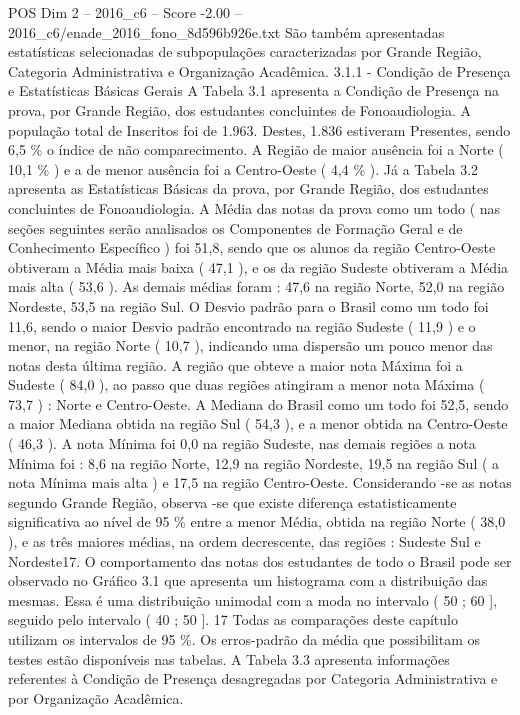 \begin{textsample}{POS Dim 2 – 2016\_c6 – Score -2.00 – 2016\_c6/enade\_2016\_fono\_8d596b926e.txt}
São também apresentadas estatísticas selecionadas de subpopulações caracterizadas por Grande Região, Categoria Administrativa e Organização Acadêmica. 3.1.1 - Condição de Presença e Estatísticas Básicas Gerais A Tabela 3.1 apresenta a Condição de Presença na prova, por Grande Região, dos estudantes concluintes de Fonoaudiologia.
A população total de Inscritos foi de 1.963.
Destes, 1.836 estiveram Presentes, sendo 6,5 \% o índice de não comparecimento.
A Região de maior ausência foi a Norte ( 10,1 \% ) e a de menor ausência foi a Centro-Oeste ( 4,4 \% ).
Já a Tabela 3.2 apresenta as Estatísticas Básicas da prova, por Grande Região, dos estudantes concluintes de Fonoaudiologia.
A Média das notas da prova como um todo ( nas seções seguintes serão analisados os Componentes de Formação Geral e de Conhecimento Específico ) foi 51,8, sendo que os alunos da região Centro-Oeste obtiveram a Média mais baixa ( 47,1 ), e os da região Sudeste obtiveram a Média mais alta ( 53,6 ).
As demais médias foram : 47,6 na região Norte, 52,0 na região Nordeste, 53,5 na região Sul.
O Desvio padrão para o Brasil como um todo foi 11,6, sendo o maior Desvio padrão encontrado na região Sudeste ( 11,9 ) e o menor, na região Norte ( 10,7 ), indicando uma dispersão um pouco menor das notas desta última região.
A região que obteve a maior nota Máxima foi a Sudeste ( 84,0 ), ao passo que duas regiões atingiram a menor nota Máxima ( 73,7 ) : Norte e Centro-Oeste.
A Mediana do Brasil como um todo foi 52,5, sendo a maior Mediana obtida na região Sul ( 54,3 ), e a menor obtida na Centro-Oeste ( 46,3 ).
A nota Mínima foi 0,0 na região Sudeste, nas demais regiões a nota Mínima foi : 8,6 na região Norte, 12,9 na região Nordeste, 19,5 na região Sul ( a nota Mínima mais alta ) e 17,5 na região Centro-Oeste.
Considerando -se as notas segundo Grande Região, observa -se que existe diferença estatisticamente significativa ao nível de 95 \% entre a menor Média, obtida na região Norte ( 38,0 ), e as três maiores médias, na ordem decrescente, das regiões : Sudeste Sul e Nordeste17.
O comportamento das notas dos estudantes de todo o Brasil pode ser observado no Gráfico 3.1 que apresenta um histograma com a distribuição das mesmas.
Essa é uma distribuição unimodal com a moda no intervalo ( 50 ; 60 ], seguido pelo intervalo ( 40 ; 50 ]. 17 Todas as comparações deste capítulo utilizam os intervalos de 95 \%.
Os erros-padrão da média que possibilitam os testes estão disponíveis nas tabelas.
A Tabela 3.3 apresenta informações referentes à Condição de Presença desagregadas por Categoria Administrativa e por Organização Acadêmica.

\end{textsample}

